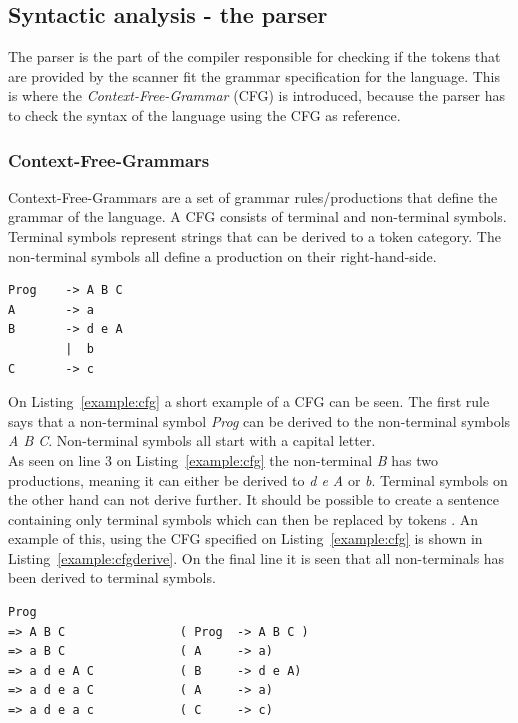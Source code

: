 \subsection{Syntactic analysis - the parser}
The parser is the part of the compiler responsible for checking if the tokens that are provided by the scanner fit the grammar specification for the language. This is where the \textit{Context-Free-Grammar} (CFG) is introduced, because the parser has to check the syntax of the language using the CFG as reference. 

\subsubsection{Context-Free-Grammars}
Context-Free-Grammars are a set of grammar rules/productions that define the grammar of the language. 
A CFG consists of terminal and non-terminal symbols. 
Terminal symbols represent strings that can be derived to a token category. 
The non-terminal symbols all define a production on their right-hand-side. 
\begin{lstlisting}[caption={Example of an Context-Free-Grammer}, label={example:cfg}]
Prog    -> A B C
A       -> a
B       -> d e A
        |  b
C       -> c

\end{lstlisting}
On Listing~\ref{example:cfg} a short example of a CFG can be seen. 
The first rule says that a non-terminal symbol \textit{Prog} can be derived to the non-terminal symbols \textit{A B C}. 
Non-terminal symbols all start with a capital letter. 
\\
As seen on line 3 on Listing~\ref{example:cfg} the non-terminal \textit{B} has two productions, meaning it can either be derived to \textit{d e A} or \textit{b}.
Terminal symbols on the other hand can not derive further. 
It should be possible to create a sentence containing only terminal symbols which can then be replaced by tokens \cite{CraftinfACompiler}.
An example of this, using the CFG specified on Listing~\ref{example:cfg} is shown in Listing~\ref{example:cfgderive}.
On the final line it is seen that all non-terminals has been derived to terminal symbols.
\begin{lstlisting}[caption={Example of an Context-Free-Grammer derivation}, label={example:cfgderive}]
Prog
=> A B C                ( Prog  -> A B C )
=> a B C                ( A     -> a)
=> a d e A C            ( B     -> d e A)
=> a d e a C            ( A     -> a)
=> a d e a c            ( C     -> c) 
\end{lstlisting}

